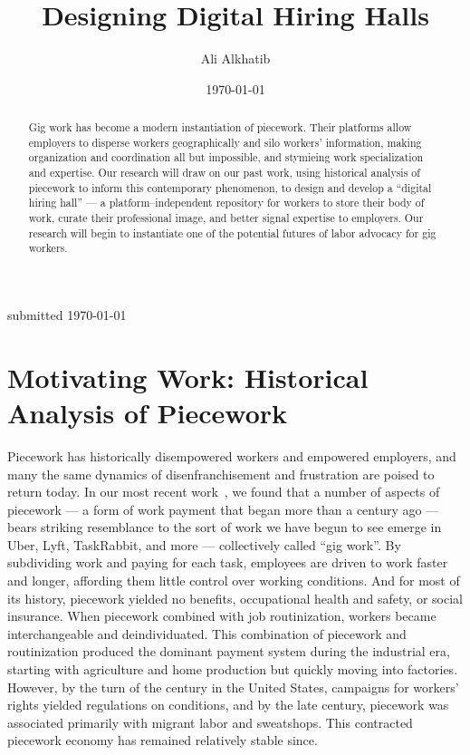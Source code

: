 \documentclass[10pt]{article}
\title{Designing Digital Hiring Halls}
\author{Ali Alkhatib}
\date{\today}
\makeatletter
\def\maketitle{%
\par{\centering {\scshape \huge \textbf{\@title}}%
\par{\@author}
\par{submitted \today}%
\par}}
\newcommand{\topic}[1]{{\color{Blue}#1}}
\renewcommand{\topic}[1]{{#1}}
\makeatother
\begin{document}
  \maketitle
  \begin{abstract}
    Gig work has become a modern instantiation of piecework.
    Their platforms allow employers to
    disperse workers geographically and silo workers' information,
    making organization and coordination all but impossible,
    and stymieing work specialization and expertise.
    Our research will draw on our past work,
    using historical analysis of piecework to inform this contemporary phenomenon,
    to design and develop a ``digital hiring hall''
    --- a platform--independent repository for workers to store their body of work, curate their professional image,
    and better signal expertise to employers.
    Our research will
    begin to instantiate one of the potential futures of labor advocacy for gig workers.
  \end{abstract}











\section*{Motivating Work: Historical Analysis of Piecework}
\topic{Piecework has historically disempowered workers and empowered employers, and
many the same dynamics of disenfranchisement and frustration are poised to return today.}
In our most recent work~\cite{pieceworkCrowdworkGigwork}, we found that a number of aspects of piecework
--- a form of work payment that began more than a century ago ---
bears striking resemblance to the sort of work we have begun to see emerge in Uber, Lyft, TaskRabbit, and more
--- collectively called ``gig work''.
By subdividing work and paying for each task, employees are driven to work faster and longer,
affording them little control over working conditions.
And for most of its history, piecework yielded no benefits, occupational health and safety, or social insurance.
When piecework combined with job routinization, workers became interchangeable and deindividuated.
This combination of piecework and routinization produced the dominant payment system during the industrial era,
starting with agriculture and home production but quickly moving into factories.
However, by the turn of the  century in the United States,
campaigns for workers' rights yielded regulations on conditions, and by the late  century,
piecework was associated primarily with migrant labor and sweatshops.
This contracted piecework economy has remained relatively stable since.
\end{document}

